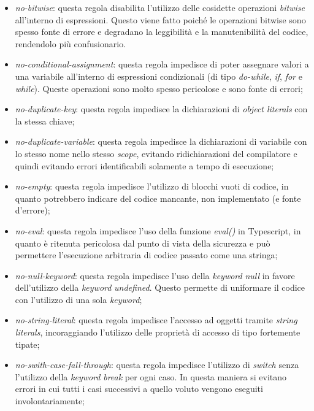 \begin{itemize}
                \item \textit{no-bitwise}: questa regola disabilita l'utilizzo delle cosidette operazioni \textit{bitwise} all'interno di espressioni. Questo viene fatto poiché le operazioni bitwise sono spesso fonte di errore e degradano la leggibilit\`a e la manutenibilità del codice, rendendolo pi\`u confusionario.
                \item \textit{no-conditional-assignment}: questa regola impedisce di poter assegnare valori a una variabile all'interno di espressioni condizionali (di tipo \textit{do-while}, \textit{if}, \textit{for} e \textit{while}). Queste operazioni sono molto spesso pericolose e sono fonte di errori;
                \item \textit{no-duplicate-key}: questa regola impedisce la dichiarazioni di \textit{object literals} con la stessa chiave;
                \item \textit{no-duplicate-variable}: questa regola impedisce la dichiarazioni di variabile con lo stesso nome nello stesso \textit{scope}, evitando ridichiarazioni del compilatore e quindi evitando errori identificabili solamente a tempo di esecuzione;
                \item \textit{no-empty}: questa regola impedisce l'utilizzo di blocchi vuoti di codice, in quanto potrebbero indicare del codice mancante, non implementato (e fonte d'errore);
                \item \textit{no-eval}: questa regola impedisce l'uso della funzione \textit{eval()} in Typescript, in quanto \`e ritenuta pericolosa dal punto di vista della sicurezza e pu\`o permettere l'esecuzione arbitraria di codice passato come una stringa;
                \item \textit{no-null-keyword}: questa regola impedisce l'uso della \textit{keyword} \textit{null} in favore dell'utilizzo della \textit{keyword} \textit{undefined}. Questo permette di uniformare il codice con l'utilizzo di una sola \textit{keyword};
                \item \textit{no-string-literal}: questa regola impedisce l'accesso ad oggetti tramite \textit{string literals}, incoraggiando l'utilizzo delle propriet\`a di accesso di tipo fortemente tipate;
                \item \textit{no-swith-case-fall-through}: questa regola impedisce l'utilizzo di \textit{switch} senza l'utilizzo della \textit{keyword} \textit{break} per ogni caso. In questa maniera si evitano errori in cui tutti i casi successivi a quello voluto vengono eseguiti involontariamente;

\end{itemize}

